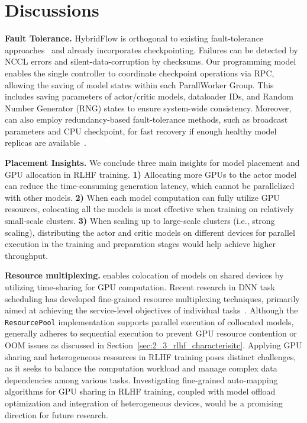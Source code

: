 \vspace{-1mm}
\section{Discussions} %
\noindent \textbf{Fault Tolerance.}
HybridFlow is orthogonal to existing fault-tolerance approaches~\cite{swift, wang2023gemini, jang2023oobleck, mohan2021checkfreq, eisenman2022check} and already incorporates checkpointing. Failures can be detected by NCCL errors and silent-data-corruption by checksums. Our programming model enables the single controller to coordinate checkpoint operations via RPC, allowing the saving of model states within each ParallWorker Group. 
This includes saving parameters of actor/critic models, dataloader IDs, and Random Number Generator (RNG) states to ensure system-wide consistency.
Moreover, \sysname{} can also employ redundancy-based fault-tolerance methods, such as broadcast parameters and CPU checkpoint, for fast recovery if enough healthy model replicas are available~\cite{swift, wang2023gemini}.





\noindent \textbf{Placement Insights.} We conclude three main insights for model placement and GPU allocation in RLHF training. 
\textbf{1)} Allocating more GPUs to the actor model can reduce the time-consuming generation latency, which cannot be parallelized with other models. 
\textbf{2)} When each model computation can fully utilize GPU resources, colocating all the models is most effective when training on relatively small-scale clusters.
\textbf{3)} When scaling up to large-scale clusters (i.e., strong scaling), distributing the actor and critic models on different devices for parallel execution in the training and preparation stages would help achieve higher throughput.

\noindent \textbf{Resource multiplexing.}
\sysname{} enables colocation of models on shared devices by utilizing time-sharing for GPU computation.
Recent research in DNN task scheduling has developed fine-grained resource multiplexing techniques, primarily aimed at achieving the service-level objectives of individual tasks~\cite{han2022microsecond, park2017multiplex-gpu, wang2016multiplex-gpu, liang2014multi-plexgpu, bai2020pipeswitch, han2022microsecond, cui2022dvabatch}.
Although the \texttt{ResourcePool} implementation supports parallel execution of collocated models, \sysname{} generally adheres to sequential execution to prevent GPU resource contention or OOM issues as discussed in Section~\ref{sec:2_3_rlhf_characterisitc}.
Applying GPU sharing and heterogeneous resources in RLHF training poses distinct challenges, as it seeks to balance the computation workload and manage complex data dependencies among various tasks.
Investigating fine-grained auto-mapping algorithms for GPU sharing in RLHF training, coupled with model offload optimization and integration of heterogeneous devices, would be a promising direction for future research.








